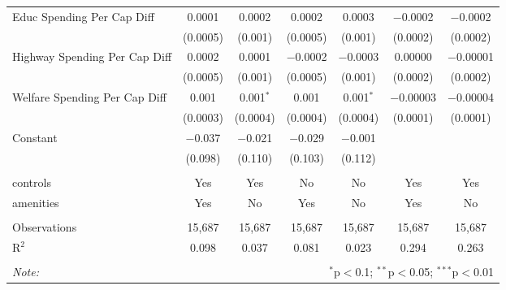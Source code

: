 \begin{table}[!htbp]
\begin{tabular}{@{\extracolsep{5pt}}lcccccc}
  Educ Spending Per Cap Diff & 0.0001 & 0.0002 & 0.0002 & 0.0003 & $-$0.0002 & $-$0.0002 \\ 
  & (0.0005) & (0.001) & (0.0005) & (0.001) & (0.0002) & (0.0002) \\ 
  Highway Spending Per Cap Diff & 0.0002 & 0.0001 & $-$0.0002 & $-$0.0003 & 0.00000 & $-$0.00001 \\ 
  & (0.0005) & (0.001) & (0.0005) & (0.001) & (0.0002) & (0.0002) \\ 
  Welfare Spending Per Cap Diff & 0.001 & 0.001$^{*}$ & 0.001 & 0.001$^{*}$ & $-$0.00003 & $-$0.00004 \\ 
  & (0.0003) & (0.0004) & (0.0004) & (0.0004) & (0.0001) & (0.0001) \\ 
  Constant & $-$0.037 & $-$0.021 & $-$0.029 & $-$0.001 &  &  \\ 
  & (0.098) & (0.110) & (0.103) & (0.112) &  &  \\ 
 \hline \\[-1.8ex] 
controls & Yes & Yes & No & No & Yes & Yes \\ 
amenities & Yes & No & Yes & No & Yes & No \\ 
\hline \\[-1.8ex] 
Observations & 15,687 & 15,687 & 15,687 & 15,687 & 15,687 & 15,687 \\ 
R$^{2}$ & 0.098 & 0.037 & 0.081 & 0.023 & 0.294 & 0.263 \\ 
\hline 
\hline \\[-1.8ex] 
\textit{Note:}  & \multicolumn{6}{r}{$^{*}$p$<$0.1; $^{**}$p$<$0.05; $^{***}$p$<$0.01} \\ 
\end{tabular} 
\end{table} 
